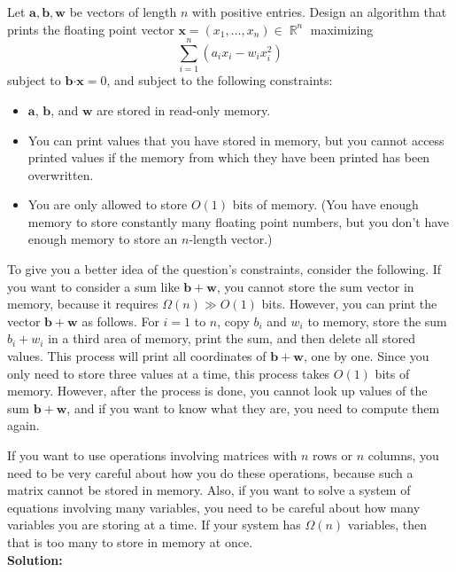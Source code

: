 \documentclass{article}
\DeclareMathOperator{\R}{\mathbb R}
\newcommand{\mb}{\mathbf}
\newcommand{\dotp}{\boldsymbol{\cdot}}
\begin{document}
Let $\mb a, \mb b, \mb w$ be vectors of length $n$ with positive entries. Design an algorithm that prints the floating point vector $\mb x = (x_1, \dots, x_n) \in \R^n$ maximizing
\[\sum_{i=1}^n ( a_i x_i - w_i x_i^2 )\]
subject to $\mb b \dotp \mb x = 0$, and subject to the following constraints:
\begin{itemize}
\item $\mb a$, $\mb b$, and $\mb w$ are stored in read-only memory.
\item You can print values that you have stored in memory, but you cannot access printed values if the memory from which they have been printed has been overwritten.
\item You are only allowed to store $O(1)$ bits of memory. (You have enough memory to store constantly many floating point numbers, but you don't have enough memory to store an $n$-length vector.)
\end{itemize}
To give you a better idea of the question's constraints, consider the following. If you want to consider a sum like $\mb b + \mb w$, you cannot store the sum vector in memory, because it requires $\Omega(n)  \gg O(1)$ bits. However, you can print the vector $\mb b + \mb w$ as follows. For $i=1$ to $n$, copy $b_i$ and $w_i$ to memory, store the sum $b_i + w_i$ in a third area of memory, print the sum, and then delete all stored values. This process will print all coordinates of $\mb b + \mb w$, one by one. Since you only need to store three values at a time, this process takes $O(1)$ bits of memory. However, after the process is done, you cannot look up values of the sum $\mb b + \mb w$, and if you want to know what they are, you need to compute them again.

If you want to use operations involving matrices with $n$ rows or $n$ columns, you need to be very careful about how you do these operations, because such a matrix cannot be stored in memory. Also, if you want to solve a system of equations involving many variables, you need to be careful about how many variables you are storing at a time. If your system has $\Omega(n)$ variables, then that is too many to store in memory at once. \\

\textbf{Solution:} \\
\end{document}
